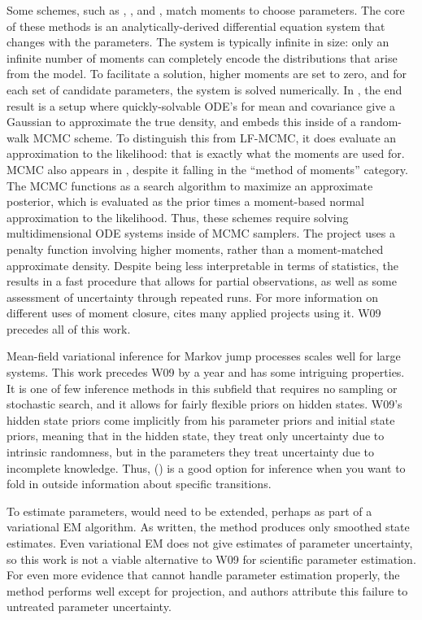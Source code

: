 \documentclass{article}
\begin{document}
Some schemes, such as \cite{milner2013moment}, \cite{kugler2012moment}, and \cite{zechner2012moment}, match moments to choose parameters. The core of these methods is an analytically-derived differential equation system that changes with the parameters. The system is typically infinite in size: only an infinite number of moments can completely encode the distributions that arise from the model. To facilitate a solution, higher moments are set to zero, and for each set of candidate parameters, the system is solved numerically. In \cite{milner2013moment}, the end result is a setup where quickly-solvable ODE's for mean and covariance give a Gaussian to approximate the true density, and \cite{milner2013moment} embeds this inside of a random-walk MCMC scheme. To distinguish this from LF-MCMC, it does evaluate an approximation to the likelihood: that is exactly what the moments are used for. MCMC also appears in \cite{zechner2012moment}, despite it falling in the ``method of moments'' category. The MCMC functions as a search algorithm to maximize an approximate posterior, which is evaluated as the prior times a moment-based normal approximation to the likelihood. Thus, these schemes require solving multidimensional ODE systems inside of MCMC samplers. The project  \cite{kugler2012moment} uses a penalty function involving higher moments, rather than a moment-matched approximate density. Despite being less interpretable in terms of statistics, the results in a fast procedure that allows for partial observations, as well as some assessment of uncertainty through repeated runs. For more information on different uses of moment closure, \cite{Milner201199} cites many applied projects using it. W09 precedes all of this work. 

Mean-field variational inference for Markov jump processes \cite{opper2008variational} scales well for large systems. This work precedes W09 by a year and has some intriguing properties. It is one of few inference methods in this subfield that requires no sampling or stochastic search, and it allows for fairly flexible priors on hidden states. W09's hidden state priors come implicitly from his parameter priors and initial state priors, meaning that in the hidden state, they treat only uncertainty due to intrinsic randomness, but in the parameters they treat uncertainty due to incomplete knowledge. Thus, (\cite{opper2008variational}) is a good option for inference when you want to fold in outside information about specific transitions.

To estimate parameters, \cite{opper2008variational} would need to be extended, perhaps as part of a variational EM algorithm. As written, the method produces only smoothed state estimates. Even variational EM does not give estimates of parameter uncertainty, so this work is not a viable alternative to W09 for scientific parameter estimation. For even more evidence that \cite{opper2008variational} cannot handle parameter estimation properly, the method performs well except for projection, and authors attribute this failure to untreated parameter uncertainty. 
\end{document}
